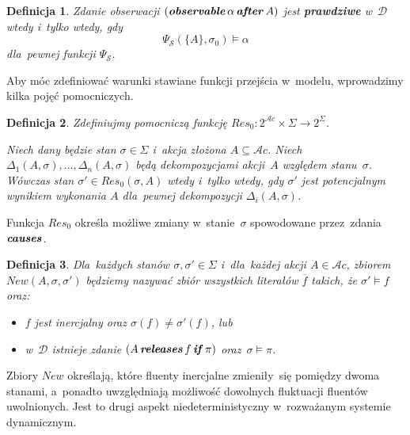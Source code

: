 \documentclass[11pt,a4paper]{article}
\newtheorem{defn}{Definicja}
\DeclareMathOperator{\After}{\textbf{\textit{after}}}
\DeclareMathOperator{\Observable}{\textbf{\textit{observable}}}
\DeclareMathOperator{\Causes}{\textbf{\textit{causes}}}
\DeclareMathOperator{\If}{\textbf{\textit{if}}}
\DeclareMathOperator{\Releases}{\textbf{\textit{releases}}}
\begin{document}
\begin{defn}
    \label{defn:observation-statement-truth}
    Zdanie obserwacji $(\Observable \alpha \After A)$ jest \textbf{prawdziwe} w~$\mathcal{D}$ wtedy i~tylko wtedy, gdy
    $$\Psi_{\mathcal{S}}(\{ A \}, \sigma_0) \models \alpha$$
    dla~pewnej funkcji $\Psi_{\mathcal{S}}$.
\end{defn}

Aby móc zdefiniować warunki stawiane funkcji przejścia w~modelu, wprowadzimy kilka pojęć pomocniczych.

\begin{defn}
    \label{defn:res0}
    Zdefiniujmy pomocniczą funkcję $Res_0: 2^{\mathcal{A}c} \times \Sigma \rightarrow 2^\Sigma$.

    Niech dany będzie stan $\sigma \in \Sigma$ i~akcja złożona $A \subseteq \mathcal{A}c$.
    Niech $\Delta_1(A, \sigma), \dots, \Delta_n(A, \sigma)$ będą dekompozycjami akcji~$A$ względem stanu~$\sigma$.
    Wówczas stan $\sigma' \in Res_0(\sigma, A)$ wtedy i~tylko wtedy, gdy $\sigma'$ jest potencjalnym wynikiem wykonania $A$ dla~pewnej dekompozycji $\Delta_i(A, \sigma)$.
\end{defn}

Funkcja $Res_0$ określa możliwe zmiany w~stanie~$\sigma$ spowodowane przez~zdania $\Causes$.

\begin{defn}
    \label{defn:new}
    Dla~każdych stanów $\sigma, \sigma' \in \Sigma$ i~dla~każdej akcji $A \in \mathcal{A}c$, zbiorem $New(A, \sigma, \sigma')$ będziemy nazywać zbiór wszystkich literałów $\overline{f}$ takich, że $\sigma' \models f$ oraz:
    \begin{itemize}
        \item $f$ jest inercjalny oraz $\sigma(f) \neq \sigma'(f)$, lub
        \item w~$\mathcal{D}$ istnieje zdanie $(A \Releases f \If \pi)$ oraz~$\sigma \models \pi$.
    \end{itemize}
\end{defn}

Zbiory $New$ określają, które fluenty inercjalne zmieniły~się pomiędzy dwoma stanami, a~ponadto uwzględniają możliwość dowolnych fluktuacji fluentów uwolnionych.
Jest to drugi aspekt niedeterministyczny w~rozważanym systemie dynamicznym.
\end{document}
